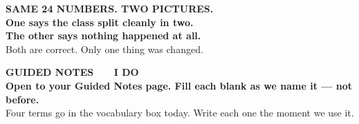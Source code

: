 \documentclass[aspectratio=169, 11pt]{beamer}
\begin{document}
{
\begin{frame}[plain]
  \vspace{1.5cm}
  \begin{center}
    {\color{skymid}\bfseries\small SAME 24 NUMBERS. TWO PICTURES.}\\[0.9cm]
    {\color{white}\bfseries\Large One says the class split cleanly in two.\\[0.4cm]
    The other says nothing happened at all.}\\[0.9cm]
    {\color{goldacc}\small Both are correct. Only one thing was changed.}
  \end{center}
\end{frame}
}

{
\begin{frame}[plain]
  \vspace{1.8cm}\hspace{0.8cm}%
  \begin{minipage}{0.86\textwidth}
    {\color{goldacc}\bfseries\small GUIDED NOTES \ \textbullet\ \ I DO}\\[0.7cm]
    {\color{white}\bfseries\Large Open to your Guided Notes page. Fill each blank as we
    name it --- not before.}\\[0.9cm]
    {\color{skymid}\small Four terms go in the vocabulary box today. Write each one the
    moment we use it.}
  \end{minipage}
\end{frame}
}
\end{document}
